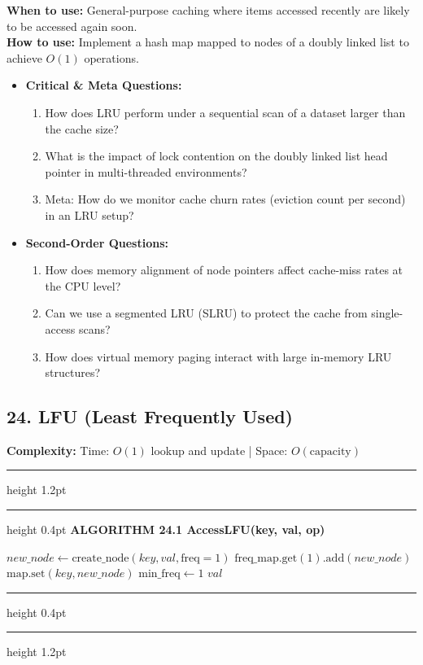 \documentclass[11pt,a4paper]{article}
\newenvironment{textbookalgo}[2]{%
  \par\addvspace{1.2em}\noindent
  \hrule height 1.2pt
  \vspace{1.5pt}
  \hrule height 0.4pt
  \vspace{5pt}
  {\noindent\large\bfseries\sffamily ALGORITHM #1 \quad #2}
  \par\vspace{5pt}
  \RestyleAlgo{plain}
}{%
  \par\vspace{4pt}
  \hrule height 0.4pt
  \vspace{1.5pt}
  \hrule height 1.2pt
  \par\addvspace{1.2em}
}
\theoremstyle{definition}
\begin{document}
\noindent
\textbf{When to use:} General-purpose caching where items accessed recently are likely to be accessed again soon.\\
\textbf{How to use:} Implement a hash map mapped to nodes of a doubly linked list to achieve $O(1)$ operations.
\begin{itemize}[leftmargin=*]
  \item[] \textbf{Critical \& Meta Questions:}
  \begin{enumerate}
    \item How does LRU perform under a sequential scan of a dataset larger than the cache size?
    \item What is the impact of lock contention on the doubly linked list head pointer in multi-threaded environments?
    \item Meta: How do we monitor cache churn rates (eviction count per second) in an LRU setup?
  \end{enumerate}
  \item[] \textbf{Second-Order Questions:}
  \begin{enumerate}
    \item How does memory alignment of node pointers affect cache-miss rates at the CPU level?
    \item Can we use a segmented LRU (SLRU) to protect the cache from single-access scans?
    \item How does virtual memory paging interact with large in-memory LRU structures?
  \end{enumerate}
\end{itemize}
\medskip


\clearpage
\subsection{24. LFU (Least Frequently Used)}

\noindent
\textbf{Complexity:} Time: $O(1)$ lookup and update | Space: $O(\text{capacity})$
\smallskip

\begin{textbookalgo}{24.1}{AccessLFU(key, val, op)}
\begin{algorithm}[H]
$new\_node \leftarrow \text{create\_node}(key, val, \text{freq}=1)$\;
$\text{freq\_map.get}(1).\text{add}(new\_node)$\;
$\text{map.set}(key, new\_node)$\;
$\text{min\_freq} \leftarrow 1$\;
\Return $val$\;
\end{algorithm}
\end{textbookalgo}
\end{document}
